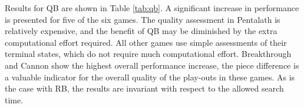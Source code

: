 \documentclass{ecai2014}
\begin{document}
Results for QB are shown in Table \ref{tab:qb}. A significant increase in performance is presented for five of the six games. The quality assessment in Pentalath is relatively expensive, and the benefit of QB may be diminished by the extra computational effort required. All other games use simple assessments of their terminal states, which do not require much computational effort. Breakthrough and Cannon show the highest overall performance increase, the piece difference is a valuable indicator for the overall quality of the play-outs in these games. As is the case with RB, the results are invariant with respect to the allowed search time.

\begin{table}
{\caption{Qualitative Bonus and Relative Bonus combined using different search times, 5000 games. Reward = terminal quality, 500 games} \label{tab:qbrb}}
\tabcolsep=0.15cm
\centering
{}
\end{table}
\end{document}
